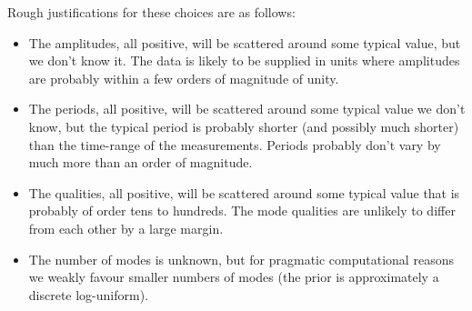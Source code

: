 \documentclass[a4paper, 12pt]{article}
\begin{document}
Rough justifications for these choices are as follows:
\begin{itemize}
    \item The amplitudes, all positive, will be scattered around some typical
          value, but we don't know it. The data is likely to be supplied
          in units where amplitudes are probably
          within a few orders of magnitude of unity.
    \item The periods, all positive, will be scattered around some typical
          value we don't know, but the typical period is probably shorter
          (and possibly much shorter) than the time-range of the measurements.
          Periods probably don't vary by much more than an order of magnitude.
    \item The qualities, all positive, will be scattered around some typical
          value that is probably of order tens to hundreds. The mode qualities
          are unlikely to differ from each other by a large margin.
    \item The number of modes is unknown, but for pragmatic computational
          reasons we weakly favour smaller numbers of modes (the prior
          is approximately a discrete log-uniform).
\end{itemize}

\end{document}
